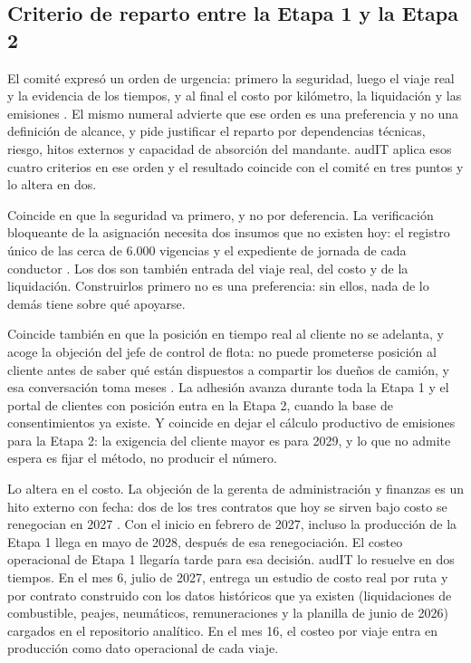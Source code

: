 \subsection{Criterio de reparto entre la Etapa 1 y la Etapa 2}\label{sec:3-criterio}

El comité expresó un orden de urgencia: primero la seguridad, luego el viaje real y la evidencia de los
tiempos, y al final el costo por kilómetro, la liquidación y las emisiones . El
mismo numeral advierte que ese orden es una preferencia y no una definición de alcance, y pide
justificar el reparto por dependencias técnicas, riesgo, hitos externos y capacidad de absorción del
mandante. audIT aplica esos cuatro criterios en ese orden y el resultado coincide con el comité en tres
puntos y lo altera en dos.

Coincide en que la seguridad va primero, y no por deferencia. La verificación bloqueante de la
asignación necesita dos insumos que no existen hoy: el registro único de las cerca de 6.000 vigencias y
el expediente de jornada de cada conductor . Los dos son también entrada del
viaje real, del costo y de la liquidación. Construirlos primero no es una preferencia: sin ellos, nada
de lo demás tiene sobre qué apoyarse.

Coincide también en que la posición en tiempo real al cliente no se adelanta, y acoge la objeción del
jefe de control de flota: no puede prometerse posición al cliente antes de saber qué están dispuestos a
compartir los dueños de camión, y esa conversación toma meses . La adhesión
avanza durante toda la Etapa 1 y el portal de clientes con posición entra en la Etapa 2, cuando la base
de consentimientos ya existe. Y coincide en dejar el cálculo productivo de emisiones para la Etapa 2:
la exigencia del cliente mayor es para 2029, y lo que no admite espera es fijar el método, no producir
el número.

Lo altera en el costo. La objeción de la gerenta de administración y finanzas es un hito externo con
fecha: dos de los tres contratos que hoy se sirven bajo costo se renegocian en 2027 . Con el inicio en febrero de 2027, incluso la producción de la Etapa 1 llega en mayo de 2028,
después de esa renegociación. El costeo operacional de Etapa 1 llegaría tarde para esa decisión.
audIT lo resuelve en dos tiempos. En el mes 6, julio de 2027, entrega un estudio de costo real por ruta
y por contrato construido con los datos históricos que ya existen (liquidaciones de combustible,
peajes, neumáticos, remuneraciones y la planilla de junio de 2026) cargados en el repositorio
analítico. En el mes 16, el costeo por viaje entra en producción como dato operacional de cada viaje.

